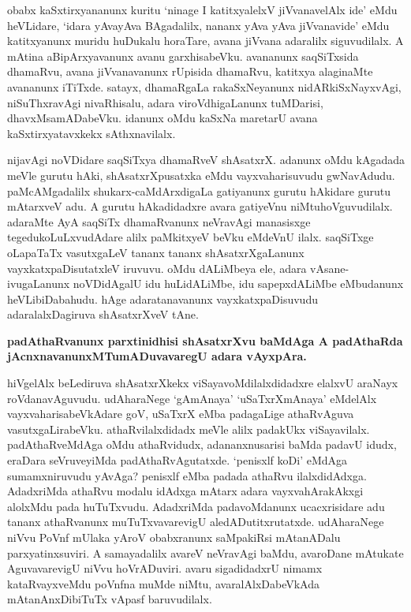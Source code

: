 \noindent
obabx kaSxtirxyananunx kuritu `ninage I katitxyalelxV jiVvanavelAlx ide' eMdu heVLidare, `idara yAvayAva BAgadalilx, nananx yAva yAva jiVvanavide' eMdu katitxyanunx muridu huDukalu horaTare, avana jiVvana adaralilx siguvudilalx. A mAtina aBipArxyavanunx avanu garxhisabeVku. avananunx saqSiTxsida dhamaRvu, avana jiVvanavanunx rUpisida dhamaRvu, katitxya alaginaMte avananunx iTiTxde. satayx, dhamaRgaLa rakaSxNeyanunx nidARkiSxNayxvAgi, niSuThxravAgi nivaRhisalu, adara viroVdhigaLanunx tuMDarisi, dhavxMsamADabeVku. idanunx oMdu kaSxNa maretarU avana kaSxtirxyatavxkekx sAthxnavilalx. 

nijavAgi noVDidare saqSiTxya dhamaRveV shAsatxrX. adanunx oMdu kAgadada meVle gurutu hAki, shAsatxrXpusatxka eMdu vayxvaharisuvudu gwNavAdudu. paMcAMgadalilx shukarx-caMdArxdigaLa gatiyanunx gurutu hAkidare gurutu mAtarxveV adu. A gurutu hAkadidadxre avara gatiyeVnu niMtuhoVguvudilalx. adaraMte AyA saqSiTx dhamaRvanunx neVravAgi manasisxge tegedukoLuLxvudAdare alilx paMkitxyeV beVku eMdeVnU ilalx. saqSiTxge oLapaTaTx vasutxgaLeV tananx tananx shAsatxrXgaLanunx vayxkatxpaDisutatxleV iruvuvu. oMdu dALiMbeya ele, adara vAsane-ivugaLanunx noVDidAgalU idu huLidALiMbe, idu sapepxdALiMbe eMbudanunx heVLibiDabahudu. hAge adaratanavanunx vayxkatxpaDisuvudu adaralalxDagiruva shAsatxrXveV tAne.

{\medskip
\noindent
{\large\bf padAthaRvanunx parxtinidhisi shAsatxrXvu baMdAga A padAthaRda jAcnxnavanunxMTumADuvavaregU adara vAyxpAra.}}\label{page198}                               
\smallskip

\noindent
hiVgelAlx beLediruva shAsatxrXkekx viSayavoMdilalxdidadxre elalxvU araNayx roVdanavAguvudu. udAharaNege `gAmAnaya' `uSaTxrXmAnaya' eMdelAlx vayxvaharisabeVkAdare goV, uSaTxrX eMba padagaLige athaRvAguva vasutxgaLirabeVku. athaRvilalxdidadx meVle alilx padakUkx viSayavilalx. padAthaRveMdAga oMdu athaRvidudx, adananxnusarisi baMda padavU idudx, eraDara seVruveyiMda padAthaRvAgutatxde. `penisxlf koDi' eMdAga sumamxniruvudu yAvAga? penisxlf eMba padada athaRvu ilalxdidAdxga. AdadxriMda athaRvu modalu idAdxga mAtarx adara vayxvahArakAkxgi alolxMdu pada huTuTxvudu. AdadxriMda padavoMdanunx ucacxrisidare adu tananx athaRvanunx muTuTxvavarevigU aledADutitxrutatxde. udAharaNege niVvu PoVnf mUlaka yAroV obabxranunx saMpakiRsi mAtanADalu parxyatinxsuviri. A samayadalilx avareV neVravAgi baMdu, avaroDane mAtukate AguvavarevigU niVvu hoVrADuviri. avaru sigadidadxrU nimamx kataRvayxveMdu poVnfna muMde niMtu, avaralAlxDabeVkAda mAtanAnxDibiTuTx vApasf baruvudilalx.

